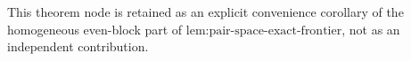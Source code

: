 This theorem node is retained as an explicit convenience corollary of the homogeneous even-block part of \(\text{lem:pair-space-exact-frontier}\), not as an independent contribution.